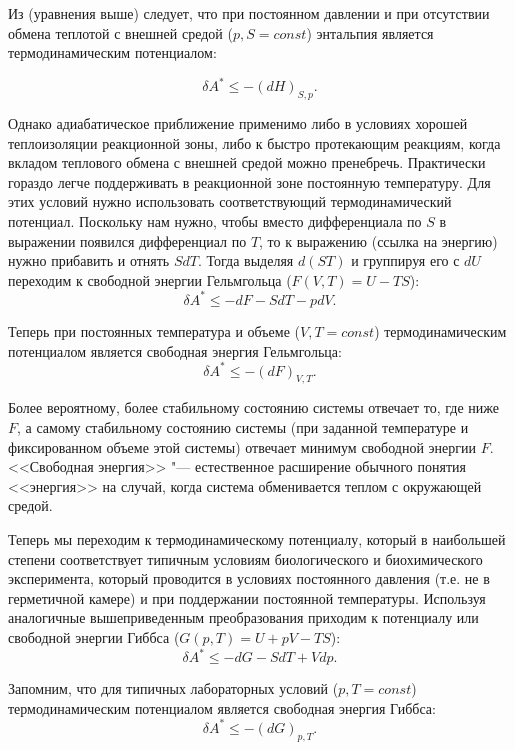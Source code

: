 \documentclass[12pt,a4paper,oneside]{book}
\begin{document}
Из (уравнения выше) следует, что при постоянном давлении и при отсутствии обмена теплотой с внешней средой  ($p, S = const$) энтальпия является термодинамическим потенциалом: 
	
\begin{equation}
	\delta A^{*} \leq - (dH)_{S,p}.
\end{equation}

Однако адиабатическое приближение применимо либо в условиях хорошей теплоизоляции реакционной зоны, либо к быстро протекающим реакциям, когда вкладом теплового обмена с внешней средой можно пренебречь. Практически гораздо легче поддерживать в реакционной зоне постоянную температуру. Для этих условий нужно использовать соответствующий термодинамический потенциал. Поскольку нам нужно, чтобы вместо дифференциала по $S$ в выражении появился дифференциал по $T$, то к выражению (ссылка на энергию) нужно прибавить и отнять $SdT$. Тогда выделяя $d(ST)$ и группируя его с $dU$ переходим к свободной энергии Гельмгольца ($F(V,T) = U - TS$):
\begin{equation}
	\delta A^{*} \leq - dF - S d T - p dV.
\end{equation}

Теперь при постоянных температура и объеме ($V, T = const$) термодинамическим потенциалом является свободная энергия Гельмгольца: 
\begin{equation}
	\delta A^{*} \leq - (dF)_{V,T}.
\end{equation}


Более вероятному, более стабильному состоянию системы отвечает то, где ниже $F$, а самому стабильному состоянию системы (при заданной температуре и фиксированном объеме этой системы) отвечает минимум свободной энергии $F$. <<Свободная энергия>> "--- естественное расширение обычного понятия <<энергия>> на случай, когда система обменивается теплом с окружающей средой.  

Теперь мы переходим к термодинамическому потенциалу, который в наибольшей степени соответствует типичным условиям биологического и биохимического эксперимента, который проводится в условиях постоянного давления (т.е. не в герметичной камере) и при поддержании постоянной температуры. Используя аналогичные вышеприведенным преобразования приходим к потенциалу или свободной энергии Гиббса ($G(p,T) = U + pV - TS$):
\begin{equation}
	\delta A^{*} \leq - dG - S d T + V dp.
\end{equation}

Запомним, что для типичных лабораторных условий ($p, T = const$) термодинамическим потенциалом является свободная энергия Гиббса: 
\begin{equation}
	\delta A^{*} \leq - (dG)_{p,T}.
\end{equation}
\end{document}
